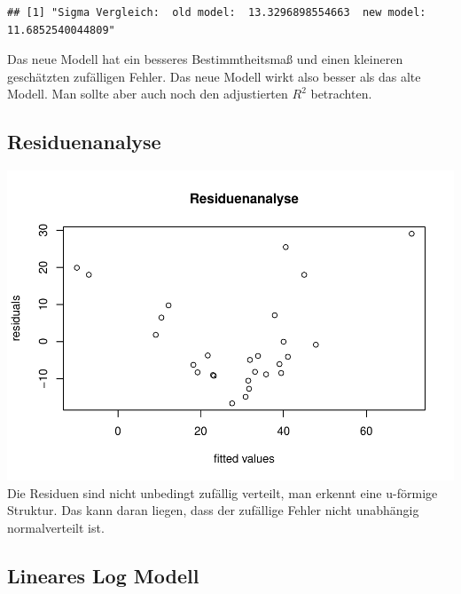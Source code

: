 \documentclass[]{article}
\newenvironment{Shaded}{\begin{snugshade}}{\end{snugshade}}
\newcommand{\DataTypeTok}[1]{\textcolor[rgb]{0.13,0.29,0.53}{#1}}
\newcommand{\KeywordTok}[1]{\textcolor[rgb]{0.13,0.29,0.53}{\textbf{#1}}}
\newcommand{\NormalTok}[1]{#1}
\newcommand{\OperatorTok}[1]{\textcolor[rgb]{0.81,0.36,0.00}{\textbf{#1}}}
\newcommand{\StringTok}[1]{\textcolor[rgb]{0.31,0.60,0.02}{#1}}
\begin{document}
\begin{verbatim}
## [1] "Sigma Vergleich:  old model:  13.3296898554663  new model:  11.6852540044809"
\end{verbatim}

Das neue Modell hat ein besseres Bestimmtheitsmaß und einen kleineren geschätzten zufälligen Fehler.
Das neue Modell wirkt also besser als das alte Modell. Man sollte aber auch noch den adjustierten \(R^2\) betrachten.

\hypertarget{residuenanalyse}{%
\subsection{Residuenanalyse}\label{residuenanalyse}}

\begin{Shaded}
\end{Shaded}

\includegraphics{Test_files/figure-latex/unnamed-chunk-20-1.pdf}
Die Residuen sind nicht unbedingt zufällig verteilt, man erkennt eine u-förmige Struktur. Das kann daran liegen, dass der
zufällige Fehler nicht unabhängig normalverteilt ist.

\hypertarget{lineares-log-modell}{%
\subsection{Lineares Log Modell}\label{lineares-log-modell}}
\end{document}

